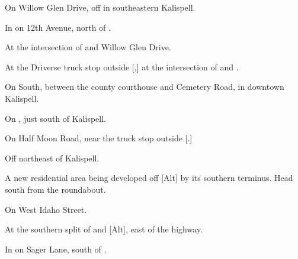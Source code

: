 

\begin{LocationList}

On Willow Glen Drive, off  in southeastern Kalispell.

In  on 12th Avenue, north of .

At the intersection of  and Willow Glen Drive.

At the Driverse truck stop outside [,] at the intersection of  and .

On  South, between the county courthouse and Cemetery Road, in downtown Kalispell.

On , just south of Kalispell.

\Location{\GarageHQ \Garage}
On Half Moon Road, near the truck stop outside [.]

Off 
northeast of Kalispell.

A new residential area being developed off [Alt] by its southern terminus. Head south from the roundabout.

\Location{\RecruitmentAgency \Recruitment}
On  West Idaho Street.

At the southern split of  and [Alt], east of the highway.

In  on Sager Lane, south of .

\end{LocationList}

